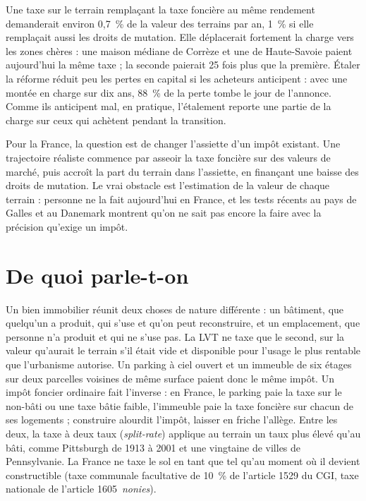 \documentclass[11pt,a4paper]{article}
\begin{document}
Une taxe sur le terrain remplaçant la taxe foncière au même rendement demanderait environ 0,7~\% de
la valeur des terrains par an, 1~\% si elle remplaçait aussi les droits de mutation. Elle
déplacerait fortement la charge vers les zones chères : une maison médiane de Corrèze et une de
Haute-Savoie paient aujourd'hui la même taxe ; la seconde paierait 25 fois plus que la première.
Étaler la réforme réduit peu les pertes en capital si les acheteurs anticipent : avec une montée
en charge sur dix ans, 88~\% de la perte tombe le jour de l'annonce. Comme ils anticipent mal, en
pratique, l'étalement reporte une partie de la charge sur ceux qui achètent pendant la
transition.

Pour la France, la question est de changer l'assiette d'un impôt existant. Une trajectoire
réaliste commence par asseoir la taxe foncière sur des valeurs de marché, puis accroît
la part du terrain dans l'assiette, en finançant une baisse des droits de mutation. Le vrai
obstacle est l'estimation de la valeur de chaque terrain : personne ne la fait aujourd'hui en
France, et les tests récents au pays de Galles et au Danemark montrent qu'on ne sait pas encore la
faire avec la précision qu'exige un impôt.

\section{De quoi parle-t-on}

Un bien immobilier réunit deux choses de nature différente : un bâtiment, que quelqu'un a produit,
qui s'use et qu'on peut reconstruire, et un emplacement, que personne n'a produit et qui ne s'use
pas. La LVT ne taxe que le second, sur la valeur qu'aurait le terrain s'il était vide et disponible
pour l'usage le plus rentable que l'urbanisme autorise. Un parking à ciel ouvert et un immeuble de
six étages sur deux parcelles voisines de même surface paient donc le même impôt. Un impôt foncier
ordinaire fait l'inverse : en France, le parking paie la taxe sur le non-bâti ou une taxe bâtie
faible, l'immeuble paie la taxe foncière sur chacun de ses logements ; construire alourdit
l'impôt, laisser en friche l'allège. Entre les deux, la taxe à deux taux (\emph{split-rate})
applique au terrain un taux plus élevé qu'au bâti, comme Pittsburgh de 1913 à 2001 et une vingtaine
de villes de Pennsylvanie. La France ne taxe le sol en tant que tel qu'au moment où il devient
constructible (taxe communale facultative de 10~\% de l'article 1529 du CGI, taxe nationale de
l'article 1605~\emph{nonies}).
\end{document}

